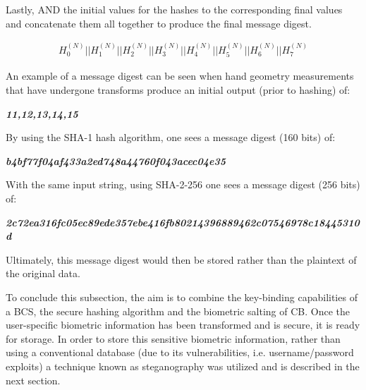         Lastly, AND the initial values for the hashes to the corresponding final values and concatenate them all together to produce the final message digest.
        
        
        \begin{gather}
            H^{(N)}_0 || H^{(N)}_1 ||H^{(N)}_2 || H^{(N)}_3 || H^{(N)}_4 || H^{(N)}_5 || H^{(N)}_6 || H^{(N)}_7 
        \end{gather} 
        
        An example of a message digest can be seen when hand geometry measurements that have undergone transforms produce an initial output (prior to hashing) of: 

        \begin{center}
            \textbf{\textit{11,12,13,14,15}}
        \end{center}
        
        By using the SHA-1 hash algorithm, one sees a message digest (160 bits) of:
        
        \begin{center}
            \textbf{\textit{b4bf77f04af433a2ed748a44760f043acec04e35}}
        \end{center}
        
        With the same input string, using SHA-2-256 one sees a message digest (256 bits) of:
        
        \begin{center}
            \textbf{\textit{2c72ea316fc05ec89ede357ebe416fb80214396889462c07546978c18445310d}}
        \end{center}
        
    

Ultimately, this message digest would then be stored rather than the plaintext of the original data.

To conclude this subsection, the aim is to combine the key-binding capabilities of a BCS, the secure hashing algorithm and the biometric salting of CB. Once the user-specific biometric information has been transformed and is secure, it is ready for storage. In order to store this sensitive biometric information, rather than using a conventional database (due to its vulnerabilities, i.e. username/password exploits) a technique known as steganography was utilized and is described in the next section. 


